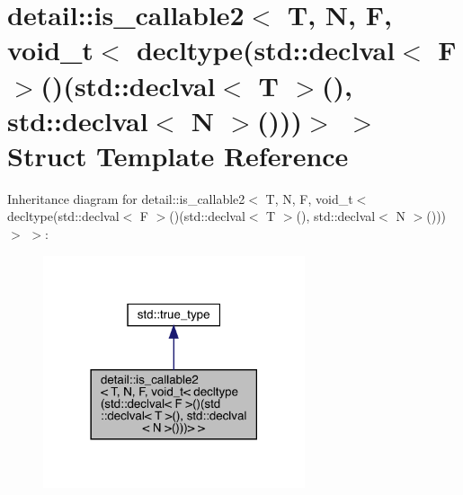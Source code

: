 \hypertarget{structdetail_1_1is__callable2_3_01_t_00_01_n_00_01_f_00_01void__t_3_01decltype_07std_1_1declval_85e36b71e7ce49c039fb03c9fdc1f60f}{}\section{detail\+:\+:is\+\_\+callable2$<$ T, N, F, void\+\_\+t$<$ decltype(std\+:\+:declval$<$ F $>$()(std\+:\+:declval$<$ T $>$(), std\+:\+:declval$<$ N $>$()))$>$ $>$ Struct Template Reference}
\label{structdetail_1_1is__callable2_3_01_t_00_01_n_00_01_f_00_01void__t_3_01decltype_07std_1_1declval_85e36b71e7ce49c039fb03c9fdc1f60f}


Inheritance diagram for detail\+:\+:is\+\_\+callable2$<$ T, N, F, void\+\_\+t$<$ decltype(std\+:\+:declval$<$ F $>$()(std\+:\+:declval$<$ T $>$(), std\+:\+:declval$<$ N $>$()))$>$ $>$\+:\nopagebreak
\begin{figure}[H]
\begin{center}
\leavevmode
\includegraphics[width=218pt]{structdetail_1_1is__callable2_3_01_t_00_01_n_00_01_f_00_01void__t_3_01decltype_07std_1_1declval_bce1e84ae13a4d0588ceab83f672541b}
\end{center}
\end{figure}


